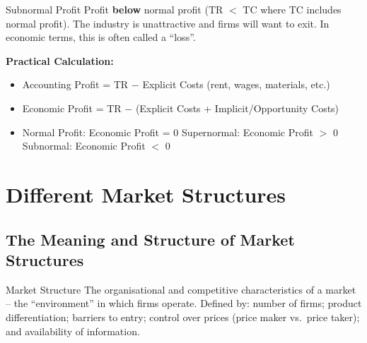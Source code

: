 \documentclass[11pt, a4paper, twoside]{book}
\begin{document}
\begin{keyterm}{Subnormal Profit}
Profit \textbf{below} normal profit (TR $<$ TC where TC includes normal profit). The industry is unattractive and firms will want to exit. In economic terms, this is often called a ``loss''.
\end{keyterm}

\textbf{Practical Calculation:}
\begin{itemize}
  \item Accounting Profit = TR $-$ Explicit Costs (rent, wages, materials, etc.)
  \item Economic Profit = TR $-$ (Explicit Costs + Implicit/Opportunity Costs)
  \item Normal Profit: Economic Profit = 0 \quad Supernormal: Economic Profit $>$ 0 \quad Subnormal: Economic Profit $<$ 0
\end{itemize}

\section{Different Market Structures}

\subsection{The Meaning and Structure of Market Structures}

\begin{keyterm}{Market Structure}
The organisational and competitive characteristics of a market -- the ``environment'' in which firms operate. Defined by: number of firms; product differentiation; barriers to entry; control over prices (price maker vs.\ price taker); and availability of information.
\end{keyterm}
\end{document}
